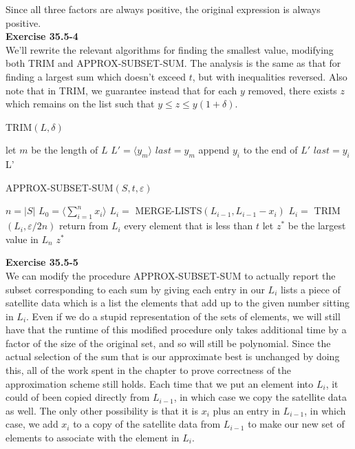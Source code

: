 \documentclass{article}
\begin{document}
Since all three factors are always positive, the original expression is always positive.\\

\noindent\textbf{Exercise 35.5-4}\\

We'll rewrite the relevant algorithms for finding the smallest value, modifying both TRIM and APPROX-SUBSET-SUM.  The analysis is the same as that for finding a largest sum which doesn't exceed $t$, but with inequalities reversed.  Also note that in TRIM, we guarantee instead that for each $y$ removed, there exists $z$ which remains on the list such that $y \leq z \leq y(1+\delta)$.\\

\begin{algorithm}
\caption{TRIM$(L,\delta)$}
\begin{algorithmic}[1]
\State let $m$ be the length of $L$
\State $L' = \langle y_m \rangle$
\State $last = y_m$
		\State append $y_i$ to the end of $L'$
		\State $last = y_i$
	\EndIf
\EndFor
\State \Return L'
\end{algorithmic}
\end{algorithm}

\begin{algorithm}
\caption{APPROX-SUBSET-SUM$(S,t,\varepsilon)$}
\begin{algorithmic}[1]
\State $n=|S|$
\State $L_0 = \langle \sum_{i=1}^n x_i \rangle$
	\State $L_i = $ MERGE-LISTS$(L_{i-1}, L_{i-1}-x_i)$
	\State $L_i = $ TRIM$(L_i, \varepsilon/2n)$
	\State return from $L_i$ every element that is less than $t$
\EndFor
\State let $z^*$ be the largest value in $L_n$
\State \Return $z^*$
\end{algorithmic}
\end{algorithm}

\noindent\textbf{Exercise 35.5-5}\\

We can modify the procedure APPROX-SUBSET-SUM to actually report the subset corresponding to each sum by giving each entry in our $L_i$ lists a piece of satellite data which is a list the elements that add up to the given number sitting in $L_i$. Even if we do a stupid representation of the sets of elements, we will still have that the runtime of this modified procedure only takes additional time by a factor of the size of the original set, and so will still be polynomial. Since the actual selection of the sum that is our approximate best is unchanged by doing this, all of the work spent in the chapter to prove correctness of the approximation scheme still holds. Each time that we put an element into $L_i$, it could of been copied directly from $L_{i-1}$, in which case we copy the satellite data as well. The only other possibility is that it is $x_i$ plus an entry in $L_{i-1}$, in which case, we add $x_i$ to a copy of the satellite data from $L_{i-1}$ to make our new set of elements to associate with the element in $L_i$.\\
\end{document}
